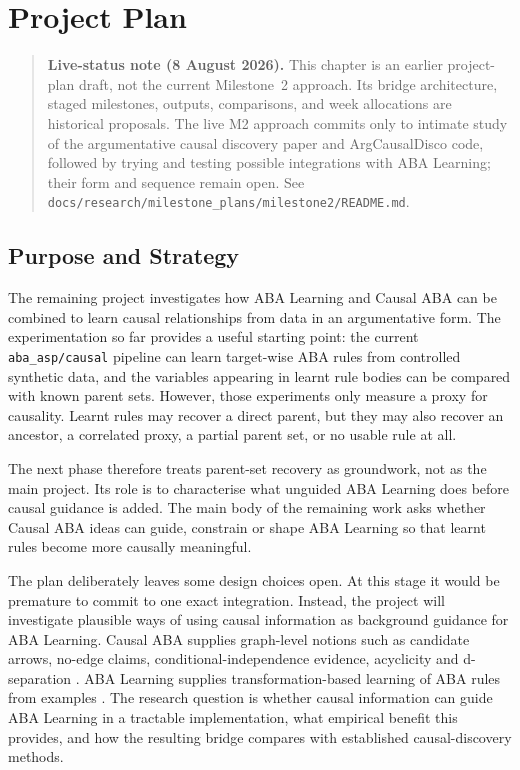 \chapter{Project Plan}
\label{ch:project-plan}

\begin{quote}
\textbf{Live-status note (8 August 2026).} This chapter is an earlier project-plan draft,
not the current Milestone~2 approach. Its bridge architecture, staged milestones, outputs,
comparisons, and week allocations are historical proposals. The live M2 approach commits
only to intimate study of the argumentative causal discovery paper and ArgCausalDisco
code, followed by trying and testing possible integrations with ABA Learning; their form
and sequence remain open. See
\texttt{docs/research/milestone\_plans/milestone2/README.md}.
\end{quote}

\section{Purpose and Strategy}
\label{sec:project-plan-purpose}

The remaining project investigates how ABA Learning and Causal ABA can be combined to learn causal relationships from data in an argumentative form. The experimentation so far provides a useful starting point: the current \texttt{aba\_asp/causal} pipeline can learn target-wise ABA rules from controlled synthetic data, and the variables appearing in learnt rule bodies can be compared with known parent sets. However, those experiments only measure a proxy for causality. Learnt rules may recover a direct parent, but they may also recover an ancestor, a correlated proxy, a partial parent set, or no usable rule at all.

The next phase therefore treats parent-set recovery as groundwork, not as the main project. Its role is to characterise what unguided ABA Learning does before causal guidance is added. The main body of the remaining work asks whether Causal ABA ideas can guide, constrain or shape ABA Learning so that learnt rules become more causally meaningful.

The plan deliberately leaves some design choices open. At this stage it would be premature to commit to one exact integration. Instead, the project will investigate plausible ways of using causal information as background guidance for ABA Learning. Causal ABA supplies graph-level notions such as candidate arrows, no-edge claims, conditional-independence evidence, acyclicity and d-separation \cite{russo2024argumentative}. ABA Learning supplies transformation-based learning of ABA rules from examples \cite{proietti2022learning,de2023aba,de2024learning}. The research question is whether causal information can guide ABA Learning in a tractable implementation, what empirical benefit this provides, and how the resulting bridge compares with established causal-discovery methods.

